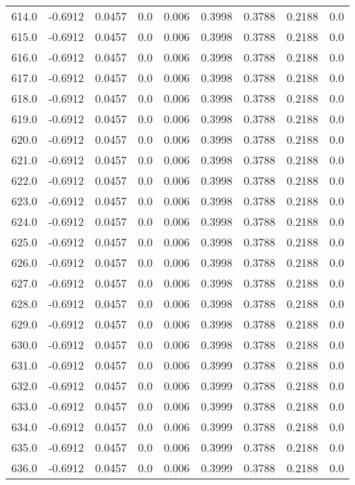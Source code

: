 \begin{longtable}{lrrrrrrrr}
614.0 & -0.6912 & 0.0457 & 0.0 & 0.006 & 0.3998 & 0.3788 & 0.2188 & 0.0 \\
615.0 & -0.6912 & 0.0457 & 0.0 & 0.006 & 0.3998 & 0.3788 & 0.2188 & 0.0 \\
616.0 & -0.6912 & 0.0457 & 0.0 & 0.006 & 0.3998 & 0.3788 & 0.2188 & 0.0 \\
617.0 & -0.6912 & 0.0457 & 0.0 & 0.006 & 0.3998 & 0.3788 & 0.2188 & 0.0 \\
618.0 & -0.6912 & 0.0457 & 0.0 & 0.006 & 0.3998 & 0.3788 & 0.2188 & 0.0 \\
619.0 & -0.6912 & 0.0457 & 0.0 & 0.006 & 0.3998 & 0.3788 & 0.2188 & 0.0 \\
620.0 & -0.6912 & 0.0457 & 0.0 & 0.006 & 0.3998 & 0.3788 & 0.2188 & 0.0 \\
621.0 & -0.6912 & 0.0457 & 0.0 & 0.006 & 0.3998 & 0.3788 & 0.2188 & 0.0 \\
622.0 & -0.6912 & 0.0457 & 0.0 & 0.006 & 0.3998 & 0.3788 & 0.2188 & 0.0 \\
623.0 & -0.6912 & 0.0457 & 0.0 & 0.006 & 0.3998 & 0.3788 & 0.2188 & 0.0 \\
624.0 & -0.6912 & 0.0457 & 0.0 & 0.006 & 0.3998 & 0.3788 & 0.2188 & 0.0 \\
625.0 & -0.6912 & 0.0457 & 0.0 & 0.006 & 0.3998 & 0.3788 & 0.2188 & 0.0 \\
626.0 & -0.6912 & 0.0457 & 0.0 & 0.006 & 0.3998 & 0.3788 & 0.2188 & 0.0 \\
627.0 & -0.6912 & 0.0457 & 0.0 & 0.006 & 0.3998 & 0.3788 & 0.2188 & 0.0 \\
628.0 & -0.6912 & 0.0457 & 0.0 & 0.006 & 0.3998 & 0.3788 & 0.2188 & 0.0 \\
629.0 & -0.6912 & 0.0457 & 0.0 & 0.006 & 0.3998 & 0.3788 & 0.2188 & 0.0 \\
630.0 & -0.6912 & 0.0457 & 0.0 & 0.006 & 0.3998 & 0.3788 & 0.2188 & 0.0 \\
631.0 & -0.6912 & 0.0457 & 0.0 & 0.006 & 0.3999 & 0.3788 & 0.2188 & 0.0 \\
632.0 & -0.6912 & 0.0457 & 0.0 & 0.006 & 0.3999 & 0.3788 & 0.2188 & 0.0 \\
633.0 & -0.6912 & 0.0457 & 0.0 & 0.006 & 0.3999 & 0.3788 & 0.2188 & 0.0 \\
634.0 & -0.6912 & 0.0457 & 0.0 & 0.006 & 0.3999 & 0.3788 & 0.2188 & 0.0 \\
635.0 & -0.6912 & 0.0457 & 0.0 & 0.006 & 0.3999 & 0.3788 & 0.2188 & 0.0 \\
636.0 & -0.6912 & 0.0457 & 0.0 & 0.006 & 0.3999 & 0.3788 & 0.2188 & 0.0 \\

\end{longtable}
